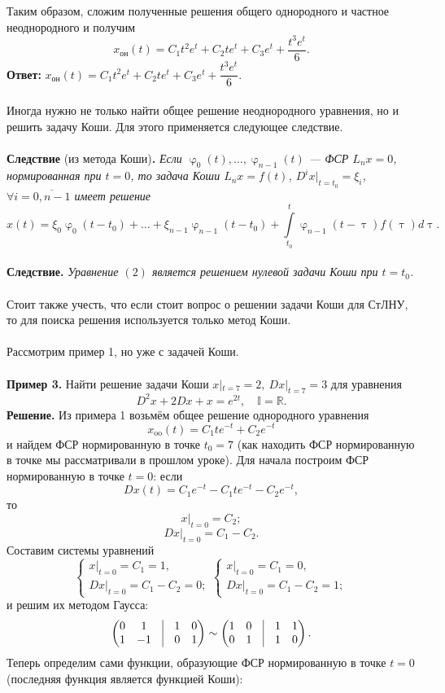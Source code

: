 \documentclass[a4paper, 12pt]{article}
\newcommand{\Rm}{\mathbb{R}}
\newcommand{\I}{\mathbb{I}}
\renewcommand{\varphi}{\upvarphi}
\begin{document}
Таким образом, сложим полученные решения общего однородного и частное неоднородного и получим
$$x_\text{он}(t) = C_1t^2e^t +C_2te^t + C_3e^t + \dfrac{t^3e^t}{6}.$$
\textbf{Ответ:} $x_\text{он}(t) = C_1t^2e^t +C_2te^t + C_3e^t + \dfrac{t^3e^t}{6}.$\\\\
Иногда нужно не только найти общее решение неоднородного уравнения, но и решить задачу Коши. Для этого применяется следующее следствие.\\\\
\textbf{Следствие} (из метода Коши)\textbf{.}
\textit{Если $\varphi_0(t),\ldots,\varphi_{n-1}(t)$ --- ФСР $L_nx = 0$, нормированная при $t=0$, то задача Коши $L_nx = f(t)$, $D^ix|_{t=t_0} = \xi_i$, $\forall i = \overline{0,n-1}$ имеет решение $$x(t) = \xi_0\varphi_0(t-t_0)+\ldots+\xi_{n-1}\varphi_{n-1}(t-t_0) + \int\limits_{t_0}^{t}\varphi_{n-1}(t-\uptau)f(\uptau)d\uptau.$$}\\
\textbf{Следствие.} \textit{Уравнение $(2)$ является решением нулевой задачи Коши при $t=t_0$.}\\\\
Стоит также учесть, что если стоит вопрос о решении задачи Коши для СтЛНУ, то для поиска решения используется только метод Коши.\\\\
Рассмотрим пример 1, но уже с задачей Коши.\\\\
\textbf{Пример 3.} Найти решение задачи Коши $x|_{t=7} = 2,\ Dx|_{t=7} = 3$ для уравнения
$$D^2x + 2Dx + x = e^{2t}, \quad \I = \Rm.$$
\textbf{Решение.} Из примера 1 возьмём общее решение однородного уравнения $$x_\text{oo}(t) = C_1te^{-t} + C_2e^{-t}$$
и найдем ФСР нормированную в точке $t_0 = 7$ (как находить ФСР нормированную в точке мы рассматривали в прошлом уроке). Для начала построим ФСР нормированную в точке $t = 0$: если
$$Dx(t) = C_1e^{-t} - C_1te^{-t} - C_2e^{-t},$$
то
$$x|_{t=0} = C_2;$$
$$Dx|_{t=0} = C_1-C_2.$$
Составим системы уравнений $$\begin{cases}
	x|_{t=0} = C_1 = 1,\\
	Dx|_{t=0} = C_1 - C_2 = 0;
\end{cases}\begin{cases}
x|_{t=0}= C_1 = 0,\\
Dx|_{t=0} = C_1 - C_2 = 1;
\end{cases}$$ и решим их методом Гаусса:$$\begin{pmatrix}
0 & 1 & \vline & 1 & 0\\
1 & -1 & \vline & 0 & 1
\end{pmatrix}\sim \begin{pmatrix}
1 & 0 & \vline &1 & 1\\
0 & 1 & \vline &1 & 0
\end{pmatrix}.$$ Теперь определим сами функции, образующие ФСР нормированную в точке $t = 0$ (последняя функция является функцией Коши):
\end{document}
